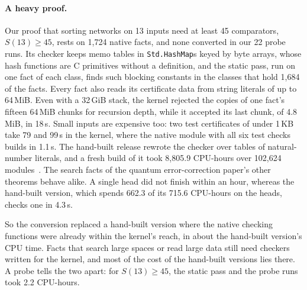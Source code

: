 \documentclass[11pt]{article}
\begin{document}
\paragraph{A heavy proof.} Our proof that sorting networks on 13 inputs need at least 45 comparators,
\(S(13)\ge 45\), rests on 1,724 native facts, and none converted in our 22 probe runs. Its checker keeps
memo tables in \texttt{Std.HashMap}s keyed by byte arrays, whose hash functions are C primitives without a
definition, and the static pass, run on one fact of each class, finds such blocking constants in the classes
that hold 1,684 of the facts. Every fact also reads its certificate data from string literals of up to
64\,MiB. Even with a 32\,GiB stack, the kernel rejected the copies of one fact's fifteen 64\,MiB chunks for
recursion depth, while it accepted its last chunk, of 4.8\,MiB, in 18\,s. Small inputs are expensive too: two test certificates of under
1\,KB take 79 and 99\,s in the kernel, where the native module with all six test checks builds in 1.1\,s. The
hand-built release rewrote the checker over tables of natural-number literals, and a fresh build of it took
8,805.9 CPU-hours over 102,624 modules~\cite{s13}. The search facts of the quantum error-correction paper's
other theorems behave alike. A single head did not finish within an hour, whereas the
hand-built version, which spends 662.3 of its 715.6 CPU-hours on the heads, checks one in 4.3\,s.

So the conversion replaced a hand-built version where the native checking functions were already within the
kernel's reach, in about the hand-built version's CPU time. Facts that search large spaces or read large data
still need checkers written for the kernel, and most of the cost of the hand-built versions lies there. A
probe tells the two apart: for \(S(13)\ge 45\), the static pass and the probe runs took 2.2 CPU-hours.
\end{document}
